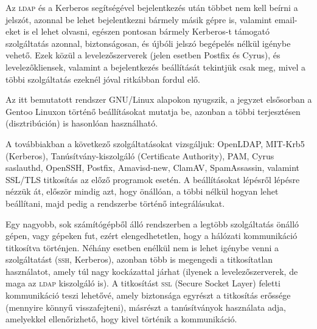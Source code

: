 Az \textsc{ldap} és a Kerberos segítségével bejelentkezés után többet nem kell beírni a jelszót, azonnal be lehet
bejelentkezni bármely másik gépre is, valamint email-eket is el lehet olvasni, egészen pontosan bármely Kerberos-t
támogató szolgáltatás azonnal, biztonságosan, és újbóli jelszó begépelés nélkül igénybe vehető. Ezek közül a
levelezőszerverek (jelen esetben Postfix és Cyrus), és levelezőkliensek, valamint a bejelentkezés beállítását tekintjük
csak meg, mivel a többi szolgáltatás ezeknél jóval ritkábban fordul elő.

Az itt bemutatott rendszer GNU/Linux alapokon nyugszik, a jegyzet elsősorban a Gentoo Linuxon történő beállításokat
mutatja be, azonban a többi terjesztésen (disztribúción) is hasonlóan használható.

A továbbiakban a következő szolgáltatásokat vizsgáljuk: 
OpenLDAP,
MIT-Krb5 (Kerberos),
Tanúsítvány-kiszolgáló (Certificate Authority),
PAM,
Cyrus saslauthd,
OpenSSH,
Postfix,
Amavisd-new,
ClamAV,
SpamAssassin,
valamint SSL/TLS titkosítás az előző programok esetén. A beállításokat lépésről lépésre nézzük át, először mindig
azt, hogy önállóan, a többi nélkül hogyan lehet beállítani, majd pedig a rendszerbe történő integrálásukat.

Egy nagyobb, sok számítógépből álló rendszerben a legtöbb szolgáltatás önálló gépen, vagy gépeken fut, ezért
elengedhetetlen, hogy a hálózati kommunikáció titkosítva történjen. Néhány esetben enélkül nem is lehet igénybe venni a
szolgáltatást (\textsc{ssh}, Kerberos), azonban több is megengedi a titkosítatlan használatot, amely túl nagy
kockázattal járhat (ilyenek a levelezőszerverek, de maga az \textsc{ldap} kiszolgáló is). A titkosítást \textsc{ssl}
(Secure Socket Layer) feletti kommunikáció teszi lehetővé, amely biztonsága egyrészt a titkosítás erőssége (mennyire
könnyű visszafejteni), másrészt a tanúsítványok használata adja, amelyekkel ellenőrizhető, hogy kivel történik a
kommunikáció.

  
